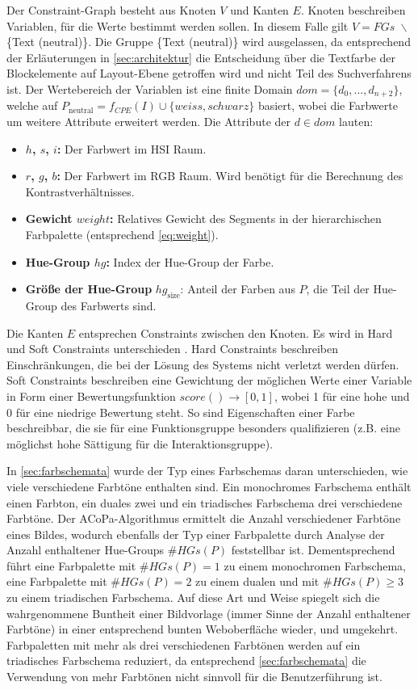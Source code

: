 Der Constraint-Graph besteht aus Knoten $V$ und Kanten $E$. Knoten beschreiben Variablen, für die Werte bestimmt werden sollen. In diesem Falle gilt $V = FGs\; \backslash$ \{Text (neutral)\}. Die Gruppe \{Text (neutral)\} wird ausgelassen, da entsprechend der Erläuterungen in \autoref{sec:architektur} die Entscheidung über die Textfarbe der Blockelemente auf Layout-Ebene  getroffen wird und nicht Teil des Suchverfahrens ist. Der Wertebereich der Variablen ist eine finite Domain $dom = \{d_0, ..., d_{n+2}\}$, welche auf $P_\text{neutral} = f_{CPE}(I) \cup \{weiss, schwarz\}$ basiert, wobei die Farbwerte um weitere Attribute erweitert werden. Die Attribute der $d \in dom$ lauten:

\begin{itemize}
	\item \textbf{$h$, $s$, $i$:} Der Farbwert im HSI Raum.
	\item \textbf{$r$, $g$, $b$:} Der Farbwert im RGB Raum. Wird benötigt für die Berechnung des Kontrastverhältnisses.
	\item \textbf{Gewicht $weight$:} Relatives Gewicht des Segments in der hierarchischen Farbpalette (entsprechend \autoref{eq:weight}).
	\item \textbf{Hue-Group $hg$:} Index der Hue-Group der Farbe.
	\item \textbf{Größe der Hue-Group} $hg_\text{size}$: Anteil der Farben aus $P$, die Teil der Hue-Group des Farbwerts sind.
\end{itemize}

Die Kanten $E$ entsprechen Constraints zwischen den Knoten. Es wird in Hard und Soft Constraints unterschieden \citep{patterns}. Hard Constraints beschreiben Einschränkungen, die bei der Lösung des Systems nicht verletzt werden dürfen. Soft Constraints beschreiben eine Gewichtung der möglichen Werte einer Variable in Form einer Bewertungsfunktion $score() \to [0, 1]$, wobei 1 für eine hohe und 0 für eine niedrige Bewertung steht. So sind Eigenschaften einer Farbe beschreibbar, die sie für eine Funktionsgruppe besonders qualifizieren (z.B. eine möglichst hohe Sättigung für die Interaktionsgruppe).

In \autoref{sec:farbschemata} wurde der Typ eines Farbschemas daran unterschieden, wie viele verschiedene Farbtöne enthalten sind. Ein monochromes Farbschema enthält einen Farbton, ein duales zwei und ein triadisches Farbschema drei verschiedene Farbtöne. Der ACoPa-Algorithmus ermittelt die Anzahl verschiedener Farbtöne eines Bildes, wodurch ebenfalls der Typ einer Farbpalette durch Analyse der Anzahl enthaltener Hue-Groups $\#HGs(P)$ feststellbar ist. Dementsprechend führt eine Farbpalette mit $\#HGs(P) = 1$ zu einem monochromen Farbschema, eine Farbpalette mit $\#HGs(P) = 2$ zu einem dualen und mit $\#HGs(P) \geq 3$ zu einem triadischen Farbschema. Auf diese Art und Weise spiegelt sich die wahrgenommene \glqq{}Buntheit\grqq{} einer Bildvorlage (immer Sinne der Anzahl enthaltener Farbtöne) in einer entsprechend bunten Weboberfläche wieder, und umgekehrt. Farbpaletten mit mehr als drei verschiedenen Farbtönen werden auf ein triadisches Farbschema reduziert, da entsprechend \autoref{sec:farbschemata} die Verwendung von mehr Farbtönen nicht sinnvoll für die Benutzerführung ist.

